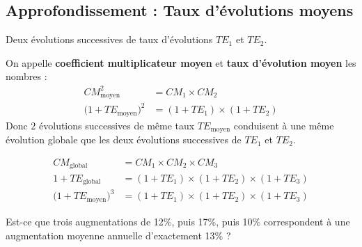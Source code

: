 \documentclass[main.tex]{subfiles}
\begin{document}
\subsection{Approfondissement : Taux d'évolutions moyens}
\begin{definition}[CM et TE moyens] Deux évolutions successives de taux d'évolutions $TE_1$ et $TE_2$.
	
	On appelle \textbf{coefficient multiplicateur moyen} et \textbf{taux d'évolution moyen} les nombres : 
	\setlength{\abovedisplayskip}{3pt}
	\setlength{\belowdisplayskip}{3pt}
	\begin{align*} 
		CM_{\text{moyen}}^2  & = CM_1 \times CM_2 \\
		\big(1+TE_{\text{moyen}}\big)^2  &= (1+TE_1 ) \times (1+TE_2)
	\end{align*}  
	Donc $2$ évolutions successives de même taux $TE_{\text{moyen}}$ conduisent à une même évolution globale que les deux évolutions successives de $TE_1$ et $TE_2$.
\end{definition} 
\begin{proposition} 
	\setlength{\abovedisplayskip}{3pt}
	\setlength{\belowdisplayskip}{3pt}
	\begin{align} 
		CM_{\text{global}}   &= CM_1 \times CM_2 \times CM_3 \label{eq.successives.3}\\
		1+TE_{\text{global}}  &= (1+TE_1 ) \times (1+TE_2) \times (1+TE_3)\label{eq.successives.4} \\
		\big(1+TE_{\text{moyen}}\big)^3  &= (1+TE_1 ) \times (1+TE_2)\times (1+TE_3)
	\end{align}
\end{proposition}  
\begin{example} Est-ce que trois augmentations de 12\%, puis 17\%, puis 10\% correspondent à une augmentation moyenne annuelle d'exactement 13\% ? 
\end{example}

\newpage 
{}  
\pagestyle{scrheadings} %
\onehalfspacing
\end{document}
